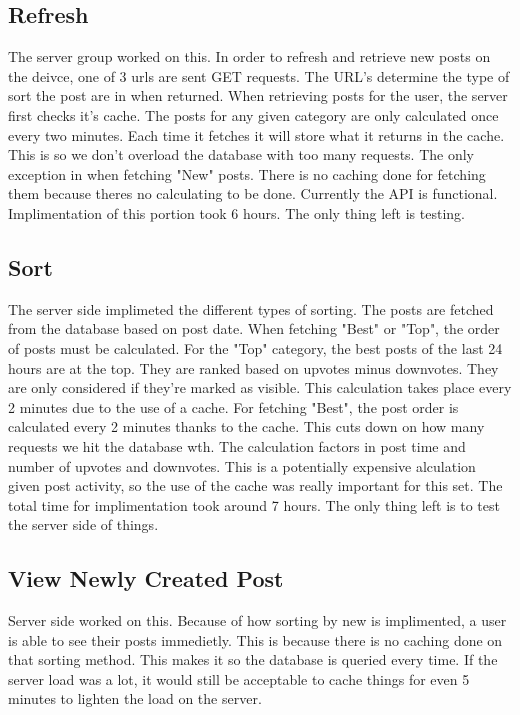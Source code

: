 \documentclass[12pt]{article}
\begin{document}
      \subsection{Refresh}
      The server group worked on this.  In order to refresh and retrieve new posts on the deivce, one of 3 urls are sent GET requests.  The URL's determine the type of sort the post are in when returned.  When retrieving posts for the user, the server first checks it's cache.  The posts for any given category are only calculated once every two minutes.  Each time it fetches it will store what it returns in the cache.  This is so we don't overload the database with too many requests.  The only exception in when fetching "New" posts. There is no caching done for fetching them because theres no calculating to be done.  Currently the API is functional.  Implimentation of this portion took 6 hours.  The only thing left is testing.
      \subsection{Sort}
      The server side implimeted the different types of sorting.  The posts are fetched from the database based on post date.  When fetching "Best" or "Top", the order of posts must be calculated.  For the "Top" category, the best posts of the last 24 hours are at the top.  They are ranked based on upvotes minus downvotes.  They are only considered if they're marked as visible.  This calculation takes place every 2 minutes due to the use of a cache.  For fetching "Best", the post order is calculated every 2 minutes thanks to the cache.  This cuts down on how many requests we hit the database wth.  The calculation factors in post time and  number of upvotes and downvotes.  This is a potentially expensive alculation given post activity, so the use of the cache was really important for this set.  The total time for implimentation took around 7 hours.  The only thing left is to test the server side of things.
      \subsection{View Newly Created Post}
      Server side worked on this.  Because of how sorting by new is implimented, a user is able to see their posts immedietly.  This is because there is no caching done on that sorting method.  This makes it so the database is queried every time.  If the server load was a lot, it would still be acceptable to cache things for even 5 minutes to lighten the load on the server.
\end{document}
